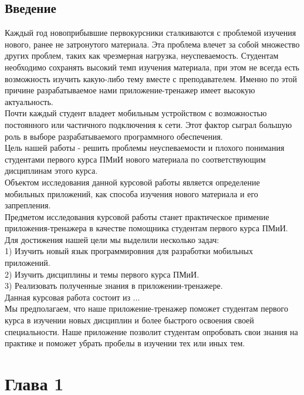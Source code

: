 \documentclass[a4paper,12pt]{article}
\begin{document}
\newpage
\section{Введение}

 Каждый год новоприбывшие первокурсники сталкиваются с проблемой изучения нового, ранее не затронутого материала. Эта проблема влечет за собой множество других проблем, таких как чрезмерная нагрузка, неуспеваемость. Студентам необходимо сохранять высокий темп изучения материала, при этом не всегда есть возможность изучить какую-либо тему вместе с преподавателем. Именно по этой причине разрабатываемое нами приложение-тренажер имеет высокую актуальность.\\

 Почти каждый студент владеет мобильным устройством с возможностью постоянного или частичного подключения к сети. Этот фактор сыграл большую роль в выборе разрабатываемого программного обеспечения. \\
 
 Цель нашей работы - решить проблемы неуспеваемости и плохого понимания студентами первого курса ПМиИ нового материала по соответствующим дисциплинам этого курса.\\

 Объектом исследования данной курсовой работы является определение мобильных приложений, как способа изучения нового материала и его запрепления.\\
 
 Предметом исследования курсовой работы станет практическое примение приложения-тренажера в качестве помощника студентам первого курса ПМиИ.\\
 
 Для достижения нашей цели мы выделили несколько задач:\\
 1) Изучить новый язык программировния для разработки мобильных приложений.\\
 2) Изучить дисциплины и темы первого курса ПМиИ.\\
 3) Реализовать полученные знания в приложении-тренажере.\\

 Данная курсовая работа состоит из ...\\

 Мы предполагаем, что наше приложение-тренажер поможет студентам первого курса в изучении новых дисциплин и более быстрого освоения своей специальности. Наше приложение позволит студентам опробовать свои знания на практике и поможет убрать пробелы в изучении тех или иных тем.\\ 


\newpage
\chapter{Глава 1}
\end{document}
